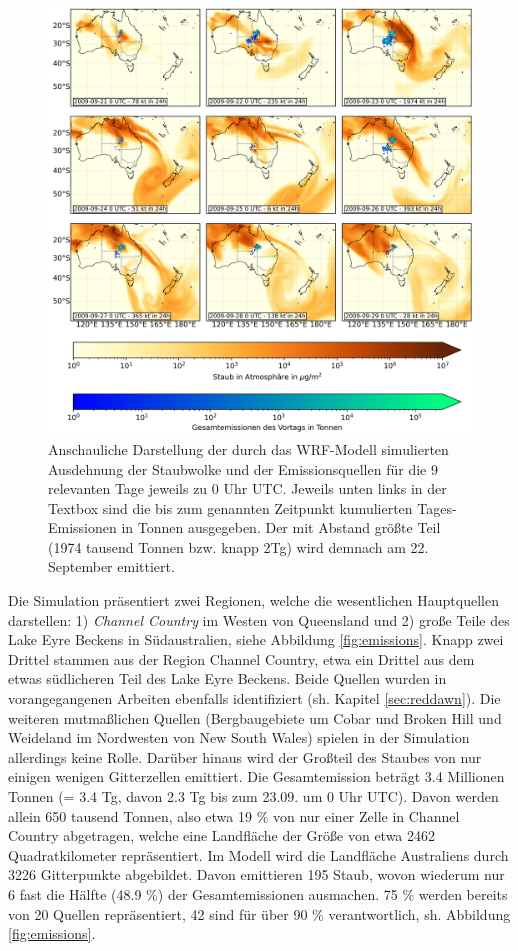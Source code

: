 \documentclass[12pt,a4paper,onecolumn]{scrartcl}
\begin{document}
\begin{figure}
\includegraphics[width=\textwidth]{bilder/dustload.png}
\caption{Anschauliche Darstellung der durch das WRF-Modell simulierten Ausdehnung der Staubwolke und der Emissionsquellen für die 9 relevanten Tage jeweils zu 0 Uhr UTC. Jeweils unten links in der Textbox sind die bis zum genannten Zeitpunkt kumulierten Tages-Emissionen in Tonnen ausgegeben. Der mit Abstand größte Teil (1974 tausend Tonnen bzw. knapp 2Tg) wird demnach am 22. September emittiert. } \label{fig:dustload}
\end{figure}
Die Simulation präsentiert zwei Regionen, welche die wesentlichen Hauptquellen darstellen: 1) \textit{Channel Country} im Westen von Queensland und 2) große Teile des Lake Eyre Beckens in Südaustralien, siehe Abbildung \ref{fig:emissions}. Knapp zwei Drittel stammen aus der Region Channel Country, etwa ein Drittel aus dem etwas südlicheren Teil des Lake Eyre Beckens. Beide Quellen wurden in vorangegangenen Arbeiten ebenfalls identifiziert (sh. Kapitel \ref{sec:reddawn}). Die weiteren mutmaßlichen Quellen (Bergbaugebiete um Cobar und Broken Hill und Weideland im Nordwesten von New South Wales) spielen in der Simulation allerdings keine Rolle. Darüber hinaus wird der Großteil des Staubes von nur einigen wenigen Gitterzellen emittiert. Die Gesamtemission beträgt 3.4 Millionen Tonnen (= 3.4 Tg, davon 2.3 Tg bis zum 23.09. um 0 Uhr UTC). Davon werden allein 650 tausend Tonnen, also etwa 19 \% von nur einer Zelle in Channel Country abgetragen, welche eine Landfläche der Größe von etwa 2462 Quadratkilometer repräsentiert. Im Modell wird die Landfläche Australiens durch 3226 Gitterpunkte abgebildet. Davon emittieren 195 Staub, wovon wiederum nur 6 fast die Hälfte (48.9 \%) der Gesamtemissionen ausmachen. 75 \% werden bereits von 20 Quellen repräsentiert, 42 sind für über 90 \% verantwortlich, sh. Abbildung \ref{fig:emissions}. 
\end{document}
